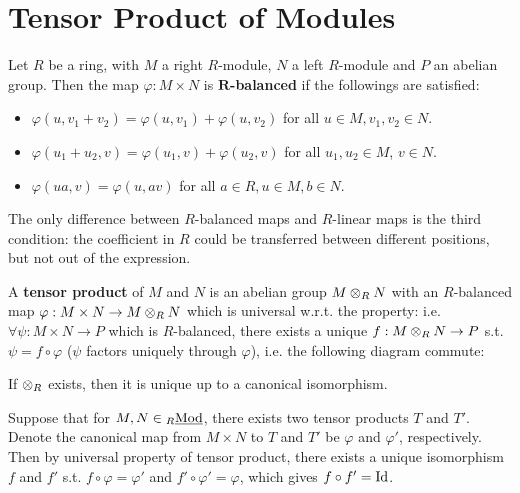\section{Tensor Product of Modules}

\begin{definition}
    Let $R$ be a ring, with $M$ a right $R$-module, $N$ a left $R$-module and $P$ an abelian group. Then the map $\varphi: M \times N$ is \textbf{$\mathbf{R}$-balanced} if the followings are satisfied:
    \begin{itemize}
        \item $\varphi(u, v_1 + v_2) = \varphi(u, v_1) + \varphi(u, v_2)$ for all $u\in M, v_1, v_2 \in N$.
        \item $\varphi(u_1 + u_2, v) = \varphi(u_1, v) + \varphi(u_2, v)$ for all $u_1, u_2 \in M$, $v \in N$.
        \item $\varphi(ua, v) = \varphi(u, av)$ for all $a \in R, u\in M, b\in N$.
    \end{itemize}
\end{definition}

\begin{remark}
    The only difference between $R$-balanced maps and $R$-linear maps is the third condition: the coefficient in $R$ could be transferred between different positions, but not out of the expression.
\end{remark}

\begin{definition}
    A \textbf{tensor product} of $M$ and $N$ is an abelian group $M \otimes_R N$ with an $R$-balanced map $\varphi: M \times N \to M \otimes_R N$ which is universal w.r.t. the property: i.e. $\forall \psi: M \times N \to P$ which is $R$-balanced, there exists a unique $f: M \otimes_R N \to P$ s.t. $\psi = f \circ \varphi$ ($\psi$ factors uniquely through $\varphi$), i.e. the following diagram commute:
    \begin{figure}[htbp]
        \centering
    \end{figure}
\end{definition}

\begin{remark}
    If $\otimes_R$ exists, then it is unique up to a canonical isomorphism. 
    
    Suppose that for $M, N \in {}_{R}\underline{\textup{Mod}}$, there exists two tensor products $T$ and $T'$. Denote the canonical map from $M \times N$ to $T$ and $T'$ be $\varphi$ and $\varphi'$, respectively. Then by universal property of tensor product, there exists a unique isomorphism $f$ and $f'$ s.t. $f \circ \varphi = \varphi'$ and $f' \circ \varphi' = \varphi$, which gives $f \circ f' = \mathrm{Id}$.
\end{remark}

